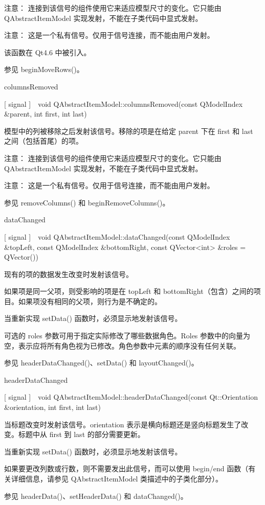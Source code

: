 注意： 连接到该信号的组件使用它来适应模型尺寸的变化。它只能由 QAbstractItemModel 实现发射，不能在子类代码中显式发射。

注意： 这是一个私有信号。仅用于信号连接，而不能由用户发射。

该函数在 Qt4.6 中被引入。

参见 beginMoveRows()。

columnsRemoved

[ signal ] void QAbstractItemModel::columnsRemoved(const QModelIndex \&parent, int first, int last)

模型中的列被移除之后发射该信号。移除的项是在给定 parent 下在 first 和 last 之间（包括首尾）的项。

注意： 连接到该信号的组件使用它来适应模型尺寸的变化。它只能由 QAbstractItemModel 实现发射，不能在子类代码中显式发射。

注意： 这是一个私有信号。仅用于信号连接，而不能由用户发射。

参见 removeColumns() 和 beginRemoveColumns()。

dataChanged

[ signal ] void QAbstractItemModel::dataChanged(const QModelIndex \&topLeft, const QModelIndex \&bottomRight, const QVector<int> \&roles = QVector())

现有的项的数据发生改变时发射该信号。

如果项是同一父项，则受影响的项是在 topLeft 和 bottomRight（包含）之间的项目。如果项没有相同的父项，则行为是不确定的。

当重新实现 setData() 函数时，必须显示地发射该信号。

可选的 roles 参数可用于指定实际修改了哪些数据角色。Roles 参数中的向量为空，表示应将所有角色视为已修改。角色参数中元素的顺序没有任何关联。

参见 headerDataChanged()、setData() 和 layoutChanged()。

headerDataChanged

[ signal ] void QAbstractItemModel::headerDataChanged(const Qt::Orientation \&orientation, int first, int last)

当标题改变时发射该信号。orientation 表示是横向标题还是竖向标题发生了改变。标题中从 first 到 last 的部分需要更新。

当重新实现 setData() 函数时，必须显示地发射该信号。

如果要更改列数或行数，则不需要发出此信号，而可以使用 begin/end 函数（有关详细信息，请参见 QAbstractItemModel 类描述中的子类化部分）。

参见 headerData()、setHeaderData() 和 dataChanged()。

